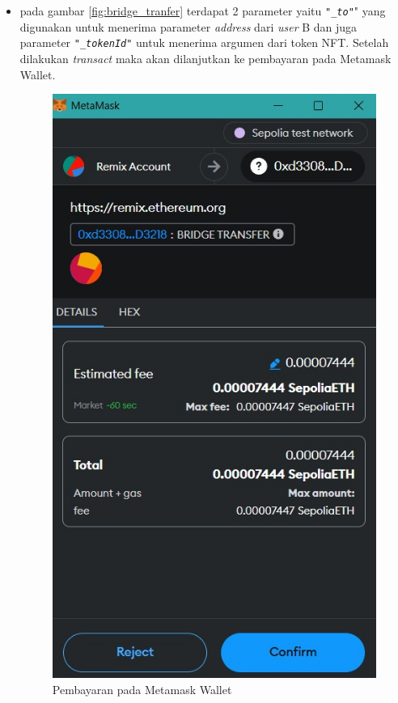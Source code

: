 \begin{itemize}
    \item pada gambar \ref{fig:bridge_tranfer} terdapat 2 parameter yaitu \texttt{"\emph{\_to}"}" yang digunakan untuk menerima parameter \emph{address} dari \emph{user} B dan juga parameter \texttt{"\emph{\_tokenId}"} untuk menerima argumen dari token NFT. Setelah dilakukan \emph{transact} maka akan dilanjutkan ke pembayaran pada Metamask Wallet.

    \begin{figure} [H] \centering
    \includegraphics[scale=0.32]{gambar/verifikasi_metamask_wallet.jpeg}
    \caption{Pembayaran pada Metamask Wallet}
    \label{fig:metamask_pembayaran}
    \end{figure}


\end{itemize}
